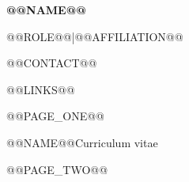 \documentclass[10pt,a4paper]{article}
\begin{document}
\color{ink}\fontsize{10.5}{13.5}\selectfont
{\color{navy}\fontsize{27}{31}\selectfont\bfseries @@NAME@@\par}
\vspace{5pt}
{\fontsize{11}{14}\selectfont @@ROLE@@\quad|\quad @@AFFILIATION@@\par}
\vspace{6pt}
{\fontsize{9.5}{12}\selectfont @@CONTACT@@\par}
\vspace{3pt}
{\fontsize{9.5}{12}\selectfont @@LINKS@@\par}

@@PAGE_ONE@@

\newpage
{\fontsize{10}{13}\selectfont\color{muted}@@NAME@@\hfill Curriculum vitae\par}
@@PAGE_TWO@@
\end{document}
